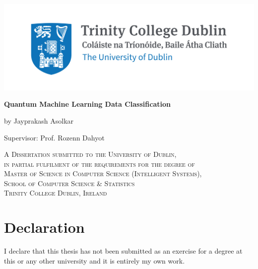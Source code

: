 \documentclass[english,a4paper,11pt,oneside,onecolumn]{book}
\begin{document}
\renewcommand{\footrulewidth}{1pt}







\begin{titlepage}
	\centering
	
\includegraphics[width=.8\linewidth]{trinity-common-use.jpg}\par\vspace{2cm}
%
	\vspace{2cm}
	{\huge\bfseries Quantum Machine Learning Data Classification\par}
	\vspace{1cm}
	{\scshape \par}
	\vspace{2cm}
	{\Large by Jayprakash Asolkar \par}
	{\Large Supervisor: Prof. Rozenn Dahyot \par}
 \vspace{1cm}
{\scshape 
A Dissertation submitted to the University of Dublin,\\
in partial fulfilment of the requirements for the degree of\\
Master of Science in Computer Science (Intelligent Systems),\\
School of Computer Science \& Statistics\\ 
Trinity College Dublin, Ireland\\
}
\end{titlepage}

\clearpage

\chapter*{Declaration}

I declare that this thesis has not been submitted as an exercise for a degree at this or
any other university and it is entirely my own work.

\vspace{0.5cm}
\end{document}
